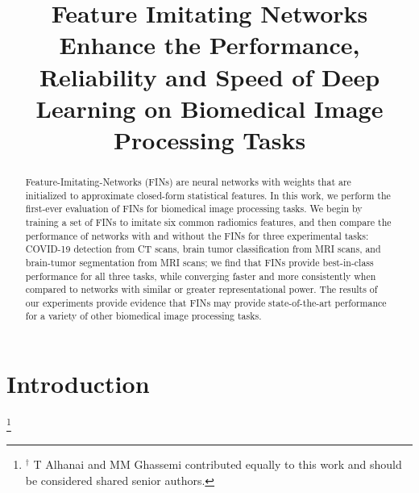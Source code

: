 \documentclass{article}
\title{Feature Imitating Networks Enhance the Performance, Reliability and Speed of Deep Learning on Biomedical Image Processing Tasks}
\newcommand\blfootnote[1]{%
  \begingroup
  \renewcommand\thefootnote{}\footnote{#1}%
  \addtocounter{footnote}{-1}%
  \endgroup
}
\begin{document}
%
\maketitle
%
\begin{abstract}

\noindent Feature-Imitating-Networks (FINs) are neural networks with weights that are initialized to approximate closed-form statistical features. In this work, we perform the first-ever evaluation of FINs for biomedical image processing tasks. We begin by training a set of FINs to imitate six common radiomics features, and then compare the performance of networks with and without the FINs for three experimental tasks: COVID-19
detection from CT scans, brain tumor classification from MRI scans, and brain-tumor segmentation from MRI scans; we find that FINs provide best-in-class performance for all three tasks, while converging faster and more consistently when compared to networks with similar or greater representational power. The results of our experiments provide evidence that FINs may provide state-of-the-art performance for a variety of other biomedical image processing tasks.
\end{abstract}

\section{Introduction}
\noindent \blfootnote{$^{\dagger}$ T Alhanai and MM Ghassemi contributed equally to this work and should be considered shared senior authors.}
\end{document}
